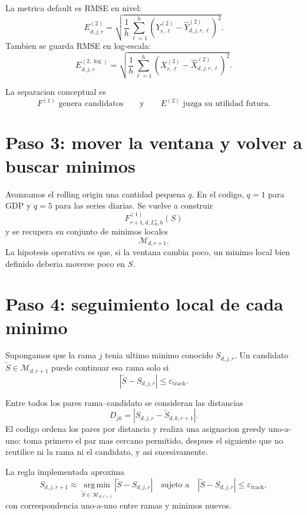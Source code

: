 \documentclass[11pt]{article}
\newcommand{\argmin}{\operatorname*{arg\,min}}
\begin{document}
La metrica default es RMSE en nivel:
\begin{equation}
E^{(2)}_{d,j,r}
=
\sqrt{
\frac{1}{h}
\sum_{\ell=1}^{h}
\left(
Y^{(2)}_{r,\ell}
-
\widehat Y^{(2)}_{d,j,r,\ell}
\right)^2
}.
\label{eq:val2level}
\end{equation}
Tambien se guarda RMSE en log-escala:
\begin{equation}
E^{(2,\log)}_{d,j,r}
=
\sqrt{
\frac{1}{h}
\sum_{\ell=1}^{h}
\left(
X^{(2)}_{r,\ell}
-
\widehat X^{(2)}_{d,j,r,\ell}
\right)^2
}.
\label{eq:val2log}
\end{equation}

La separacion conceptual es
\[
\boxed{F^{(1)}\text{ genera candidatos}}
\qquad
\text{y}
\qquad
\boxed{E^{(2)}\text{ juzga su utilidad futura}}.
\]

\section{Paso 3: mover la ventana y volver a buscar minimos}

Avanzamos el rolling origin una cantidad pequena \(q\). En el codigo,
\(q=1\) para GDP y \(q=5\) para las series diarias. Se vuelve a construir
\[
F^{(1)}_{r+1,d,L_d^\star,h}(S)
\]
y se recupera su conjunto de minimos locales
\[
\mathcal{M}_{d,r+1}.
\]
La hipotesis operativa es que, si la ventana cambia poco, un minimo local bien
definido deberia moverse poco en \(S\).

\section{Paso 4: seguimiento local de cada minimo}

Supongamos que la rama \(j\) tenia ultimo minimo conocido \(S_{d,j,r}\). Un
candidato \(\widetilde S\in\mathcal{M}_{d,r+1}\) puede continuar esa rama solo
si
\begin{equation}
|\widetilde S-S_{d,j,r}|
\le
\varepsilon_{\mathrm{track}}.
\label{eq:track}
\end{equation}

Entre todos los pares rama--candidato se consideran las distancias
\[
D_{jk}
=
|S_{d,j,r}-\widetilde S_{d,k,r+1}|.
\]
El codigo ordena los pares por distancia y realiza una asignacion greedy
uno-a-uno: toma primero el par mas cercano permitido, despues el siguiente que
no reutilice ni la rama ni el candidato, y asi sucesivamente.

La regla implementada aproxima
\begin{equation}
S_{d,j,r+1}
\approx
\argmin_{\widetilde S\in\mathcal{M}_{d,r+1}}
|\widetilde S-S_{d,j,r}|
\quad
\text{sujeto a}
\quad
|\widetilde S-S_{d,j,r}|
\le
\varepsilon_{\mathrm{track}},
\label{eq:continuation-rule}
\end{equation}
con correspondencia uno-a-uno entre ramas y minimos nuevos.
\end{document}
